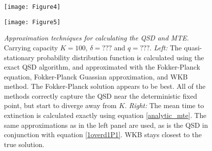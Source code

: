 \begin{figure}[h]
	\centering
	\begin{minipage}{0.49\linewidth}
		\centering
		\texttt{[image: Figure4]}
	\end{minipage}
	\begin{minipage}{0.49\linewidth}
		\centering
		\texttt{[image: Figure5]}
	\end{minipage}
	\caption{\emph{Approximation techniques for calculating the QSD and MTE.} Carrying capacity $K=100$, $\delta=???$ and $q=???$. %
	\emph{Left:} The quasi-stationary probability distribution function is calculated using the exact QSD algorithm, and approximated with the Fokker-Planck equation, Fokker-Planck Guassian approximation, and WKB method. %
	The Fokker-Planck solution appears to be best. %
	All of the methods correctly capture the QSD near the deterministic fixed point, but start to diverge away from $K$. 
	\emph{Right:} The mean time to extinction is calculated exactly using equation \ref{analytic_mte}. The same approximations as in the left panel are used, as is the QSD in conjunction with equation \ref{1overd1P1}. WKB stays closest to the true solution. %
	}
	\label{techn}
\end{figure}


